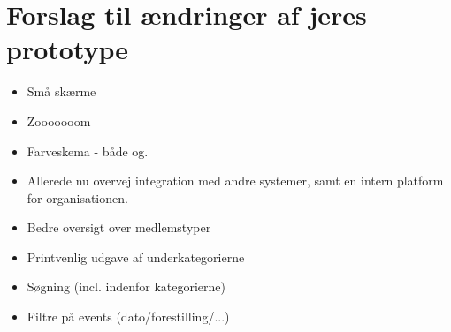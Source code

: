 \section{Forslag til ændringer af jeres prototype}

\begin{itemize}
\item Små skærme
\item Zooooooom
\item Farveskema - både og.
\item Allerede nu overvej integration med andre systemer, samt en intern
platform for organisationen.
\item Bedre oversigt over medlemstyper
\item Printvenlig udgave af underkategorierne
\item Søgning (incl. indenfor kategorierne)
\item Filtre på events (dato/forestilling/...)
\end{itemize}
